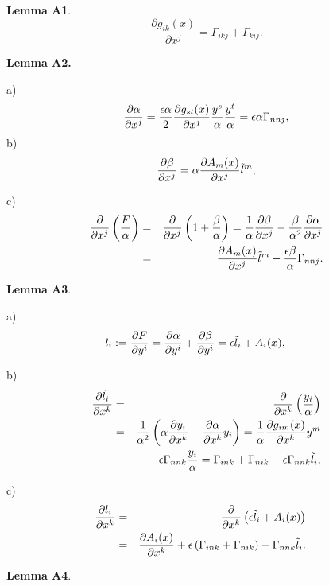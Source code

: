 \documentclass[aps,superscriptaddress, showpacs,preprintnumbers, superscriptaddress, nofootinbibt,twocolumn]{revtex4-2}
\def\be{\begin{equation}}
\def\ee{\end{equation}}
\def\bea{\begin{eqnarray}}
\def\eea{\end{eqnarray}}
\begin{document}
{\bf Lemma A1}.
\be
\frac{\partial g_{ik}(x)}{\partial x^j}=\Gamma _{ikj}+\Gamma _{kij}.
\ee

\textbf{Lemma A2. }

a)
\be
\frac{\partial \alpha }{\partial x^{j}}=\frac{\epsilon \alpha }{2}%
\frac{\partial g_{st}(x)}{\partial x^{j}}\frac{y^{s}}{\alpha }\frac{y^{t}}{%
\alpha }={\epsilon \alpha }{\Gamma}_{nnj},
\ee
b) \be\frac{\partial \beta }{\partial x^{j}}=\alpha \frac{\partial A_{m}(x)}{%
\partial x^{j}}\tilde{l}^{m},\ee

c)
\bea\frac{\partial }{\partial x^{j}}\left( \frac{F}{\alpha }\right) &=&\frac{%
\partial }{\partial x^{j}}\left( 1+\frac{\beta }{\alpha }\right) =\frac{1}{%
\alpha }\frac{\partial \beta }{\partial x^{j}}-\frac{\beta }{\alpha ^{2}}%
\frac{\partial \alpha }{\partial x^{j}}\nonumber\\
&=&\frac{\partial A_{m}(x)}{\partial
x^{j}}\tilde{l}^{m}-\frac{\epsilon \beta }{\alpha }{\Gamma}_{nnj}.\eea

{\bf Lemma A3}.

a) \be
\hspace{-0.7cm}l_{i}:=\frac{\partial F}{\partial y^{i}}=\frac{\partial \alpha}{\partial y^{i}%
}+\frac{\partial \beta }{\partial y^{i}}=\epsilon \tilde{l}_{i}+A_{i}(x),\ee

b)
\bea
\frac{\partial \tilde{l}_{i}}{\partial x^{k}}&=&\frac{\partial }{\partial
x^{k}}\left( \frac{y_{i}}{\alpha }\right) \nonumber\\
&=&\frac{1}{\alpha ^{2}}\left(
\alpha \frac{\partial y_{i}}{\partial x^{k}}-\frac{\partial \alpha }{%
\partial x^{k}}y_{i}\right) =\frac{1}{\alpha }\frac{\partial g_{im}(x)}{%
\partial x^{k}}y^{m}\nonumber\\
&-&{\epsilon }{\Gamma} _{nnk}\frac{y_{i}}{\alpha }%
={\Gamma} _{ink}+{\Gamma} _{nik}-{\epsilon }{\Gamma} _{nnk}\tilde{l}%
_{i},
\eea

c) \bea
\hspace{-0.4cm}\frac{\partial l_{i}}{\partial x^{k}}&=&\frac{\partial }{\partial x^k}\left(\epsilon \tilde{l}_{i}+A_{i}(x)\right)\nonumber\\
\hspace{-0.4cm}&=&\frac{\partial  A_{i}(x)}{\partial x^{k}}%
+\epsilon \left({ \Gamma} _{ink}+{\Gamma} _{nik}\right) -{\Gamma} _{nnk}\tilde{l}_{i} .
\eea

{\bf Lemma A4}.
\end{document}
